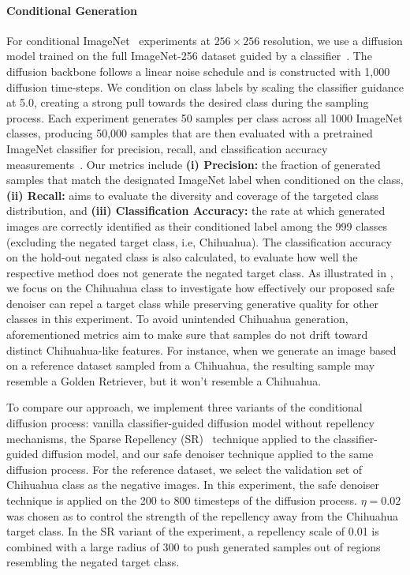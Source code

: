 \paragraph{Conditional Generation}
For conditional ImageNet~\cite{russakovsky2015imagenet} experiments at $256 \times 256$ resolution, we use a diffusion model trained on the full ImageNet-256 dataset guided by a classifier~\cite{dhariwal2021diffusion}. 
The diffusion backbone follows a linear noise schedule and is constructed with 1,000 diffusion time-steps. We condition on class labels by scaling the classifier guidance at 5.0, creating a strong pull towards the desired class during the sampling process. 
Each experiment generates 50 samples per class across all 1000 ImageNet classes, producing 50,000 samples that are then evaluated with a pretrained ImageNet classifier for precision, recall, and classification accuracy measurements~\cite{he2016dppresnet50}. 
Our metrics include \textbf{(i) Precision: } the fraction of generated samples that match the designated ImageNet label when conditioned on the class, \textbf{(ii) Recall: } aims to evaluate the diversity and coverage of the targeted class distribution, and \textbf{(iii) Classification Accuracy: } the rate at which generated images are correctly identified as their conditioned label among the 999 classes (excluding the negated target class, i.e, Chihuahua). 
The classification accuracy on the hold-out negated class is also calculated, to evaluate how well the respective method does not generate the negated target class. 
As illustrated in , we focus on the Chihuahua class to investigate how effectively our proposed safe denoiser can repel a target class while preserving generative quality for other classes in this experiment. 
To avoid unintended Chihuahua generation, aforementioned metrics aim to make sure that samples do not drift toward distinct Chihuahua-like features.
For instance, when we generate an image based on a reference dataset sampled from a Chihuahua, the resulting sample may resemble a Golden Retriever, but it won’t resemble a Chihuahua.

To compare our approach, we implement three variants of the conditional diffusion process: vanilla classifier-guided diffusion model without repellency mechanisms, the Sparse Repellency (SR)~\cite{kirchhof2024sparse} technique applied to the classifier-guided diffusion model, and our safe denoiser technique applied to the same diffusion process. 
For the reference dataset, we select the validation set of Chihuahua class as the negative images.
In this experiment, the safe denoiser technique is applied on the 200 to 800 timesteps of the diffusion process. $\eta=0.02$ was chosen as to control the strength of the repellency away from the Chihuahua target class. 
In the SR variant of the experiment, a repellency scale of 0.01 is combined with a large radius of 300 to push generated samples out of regions resembling the negated target class.